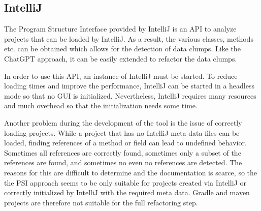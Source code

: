 \begin{comment}
\subsection{ChatGPT}
ChatGPT is another approach to detect data clumps as it can process code easily and report data clumps in any format the user wants. It also supports many programming languages that other tools do not provide.

However, ChatGPT has a limited context size, so that processing large projects is  either too costly or simply not possible.

Additionally, giving ChatGPT the right instructions to find data clumps can be challenging. While ChatGPT can define and find some data clumps without further context, it is better to give it a precise definition to work with. The following definition leads to good result, however it cannot be guaranteed that this will work forever:


A data clump exists
\begin{enumerate}
   
   \item if at least three fields also exists in another class
   \item if at least three fields also exists as method parameters in some method
    \item if two methods have at least three common parameters
\end{enumerate}
\end{comment}

\subsection{IntelliJ}
The Program Structure Interface provided by IntelliJ is an \ac{API} to analyze projects that can be loaded by IntelliJ. As a result, the various classes, methods etc. can be obtained which allows for the detection of data clumps. Like the ChatGPT approach, it can be easily extended to refactor the data clumps.

In order to use this API, an instance of IntelliJ must be started. To reduce loading times and improve the performance, IntelliJ can be started in a headless mode so that no GUI is initialized. Nevertheless, IntelliJ requires many resources and much overhead so that  the initialization  needs some time.

Another problem during the development of the tool is the issue of correctly loading projects. While a project that has no IntelliJ meta data files can be loaded, finding references of a method or field can lead to undefined behavior. Sometimes all references are correctly found, sometimes only a subset of the references are found, and sometimes no even no references are detected. The reasons for this are difficult to determine and the documentation is scarce, so the the PSI approach seems to be only suitable for projects created via IntelliJ or correctly initialized by IntelliJ with the required meta data. Gradle and maven projects are therefore not suitable for the full refactoring step. 

